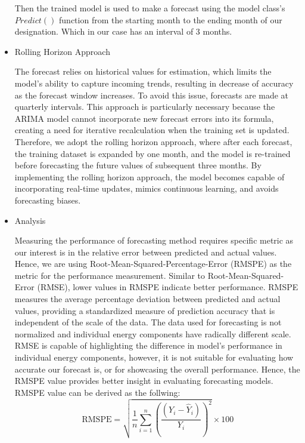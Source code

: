 \documentclass[acmtog]{acmart}
\begin{document}
\begin{itemize}
Then the trained model is used to make a forecast using the model class's ${Predict()}$ function from the starting month to the ending month of our designation. Which in our case has an interval of 3 months.\\

\item Rolling Horizon Approach

The forecast relies on historical values for estimation, which limits the model's ability to capture incoming trends, resulting in decrease of accuracy as the forecast window increases. To avoid this issue, forecasts are made at quarterly intervals. This approach is particularly necessary because the ARIMA model cannot incorporate new forecast errors into its formula, creating a need for iterative recalculation when the training set is updated. Therefore, we adopt the rolling horizon approach, where after each forecast, the training dataset is expanded by one month, and the model is re-trained before forecasting the future values of subsequent three months. By implementing the rolling horizon approach, the model becomes capable of incorporating real-time updates, mimics continuous learning, and avoids forecasting biases.\\

\item Analysis

Measuring the performance of forecasting method requires specific metric as our interest is in the relative error between predicted and actual values. Hence, we are using Root-Mean-Squared-Percentage-Error (RMSPE) as the metric for the performance measurement. Similar to Root-Mean-Squared-Error (RMSE), lower values in RMSPE indicate better performance. RMSPE measures the average percentage deviation between predicted and actual values, providing a standardized measure of prediction accuracy that is independent of the scale of the data. The data used for forecasting is not normalized and individual energy components have radically different scale. RMSE is capable of highlighting the difference in model's performance in individual energy components, however, it is not suitable for evaluating how accurate our forecast is, or for showcasing the overall performance. Hence, the RMSPE value provides better insight in evaluating forecasting models. \\

RMSPE value can be derived as the follwing:
\begin{displaymath}
\text{RMSPE} = \sqrt{\frac{1}{n} \sum_{i=1}^{n} \left( \frac{(Y_i - \hat{Y}_i)}{Y_i} \right)^2} \times 100
\end{displaymath} \\


\end{itemize}
\end{document}
